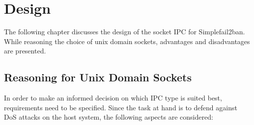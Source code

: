 %
%

\chapter{Design}
\label{cha:design}
The following chapter discusses the design of the socket \ac{IPC} for Simplefail2ban.
While reasoning the choice of unix domain sockets, advantages and disadvantages are presented.

\section{Reasoning for Unix Domain Sockets}
In order to make an informed decision on which \ac{IPC} type is suited best, requirements need to be specified.
Since the task at hand is to defend against \ac{DoS} attacks on the host system, the following aspects are considered\cite{raatschen:ipc}:

